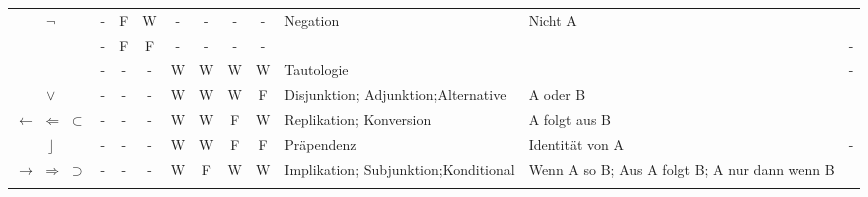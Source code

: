\documentclass[english,ngerman,parskip=half,headsepline,footsepline,
	fleqn,notitlepage]{scrreprt}
\newcommand*{\texttrue}{W}%
\newcommand*{\textfalse}{F}%
\newcommand*{\lrep}{\leftarrow}%
\newcommand*{\lrepA}{\Leftarrow}%
\newcommand*{\lrepB}{\subset}%
\newcommand*{\lleft}{\operatorname{\rfloor}}%
\newcommand*{\limp}{\rightarrow}%
\newcommand*{\limpA}{\Rightarrow}%
\newcommand*{\limpB}{\supset}%
\begin{document}
\begin{table}
\begin{threeparttable}
\begin{tabularx}{\linewidth-10.95pt}{c||c:cc:cccc|X:X|c|}
				\tableline%

				$\lnot$
				& - & \textfalse & \texttrue  & - & - & - & -
				& Negation            & Nicht A          & \thepnot{} \\

				\tableline%

				& - & \textfalse & \textfalse & - & - & - & -
				&                     &                  & -                 \\

				\hline%

				~ & - & - & - &\texttrue&\texttrue&\texttrue&\texttrue
				& Tautologie
				&
				& - \\

				\tableline%


				$\lor$
				& - & - & - &\texttrue&\texttrue&\texttrue&\textfalse
				& Disjunktion; Adjunktion;\newline Alternative
				& A oder B
				& \thepor \\

				\tableline%

				$\lrep$ $\lrepA$ $\lrepB$
				& - & - & - &\texttrue&\texttrue&\textfalse&\texttrue
				& Replikation; Konversion
				& A folgt aus B
				& \theprep \\

				\tableline%

				$\lleft$
				& - & - & - &\texttrue&\texttrue&\textfalse&\textfalse
				& Präpendenz
				& Identität von A
				& - \\

				\tablegroup%

				$\limp$ $\limpA$ $\limpB$
				& - & - & - &\texttrue&\textfalse&\texttrue&\texttrue
				& Implikation; Subjunktion;\newline Konditional
				& Wenn A so B; Aus A folgt B; A nur dann wenn B
				& \thepimp \\

				\tableline%


\end{tabularx}
\end{threeparttable}
\end{table}
\end{document}
